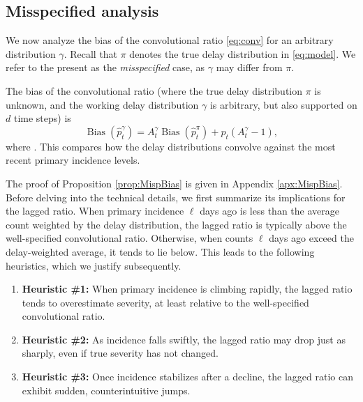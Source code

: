 \documentclass{article}
\renewcommand{\hat}{\widehat} %
\DeclareMathOperator{\bias}{Bias}
\begin{document}
\subsection{Misspecified analysis}
\label{sec:misspecified}

We now analyze the bias of the convolutional ratio \eqref{eq:conv} for an
arbitrary distribution $\gamma$. Recall that $\pi$ denotes the true delay
distribution in \eqref{eq:model}. We refer to the present as the
\emph{misspecified} case, as $\gamma$ may differ from $\pi$.    

\begin{proposition}
\label{prop:MispBias}
The bias of the convolutional ratio \smash{$\hat{p}_t^\gamma$} (where the true 
delay distribution $\pi$ is unknown, and the working delay distribution $\gamma$
is arbitrary, but also supported on $d$ time steps) is
\begin{equation}
\label{eq:MispBias}
\bias(\hat{p}_t^\gamma) = A_t^\gamma \bias(\hat{p}_t^\pi) + p_t (A_t^\gamma-1),  
\end{equation}
where . This compares how the delay distributions convolve against  
the most recent primary incidence levels. 
\end{proposition}

The proof of Proposition \ref{prop:MispBias} is given in 
Appendix \ref{apx:MispBias}. 
Before delving into the technical details, we first summarize its implications for the lagged ratio.
When primary incidence $\ell$ days ago is less than the average count weighted by the delay distribution, 
the lagged ratio is typically above the well-specified convolutional ratio. 
Otherwise, when counts $\ell$ days ago exceed the delay-weighted average, 
it tends to lie below.
This leads to the following heuristics, which we justify subsequently.
\begin{enumerate}
    \item \textbf{Heuristic \#1:} When primary incidence is climbing rapidly, the lagged ratio tends to overestimate severity, at least relative to the well-specified convolutional ratio.
    \item \textbf{Heuristic \#2:} As incidence falls swiftly, the lagged ratio may drop just as sharply, even if true severity has not changed.
    \item \textbf{Heuristic \#3:} Once incidence stabilizes after a decline, the lagged ratio can exhibit sudden, counterintuitive jumps.
\end{enumerate}
\end{document}
